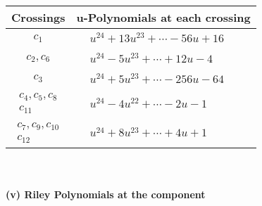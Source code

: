 \documentclass[1p]{elsarticle_modified}
\theoremstyle{definition}
\begin{document}
\begin{tabular}{m{50pt}|m{274pt}}
Crossings & \hspace{64pt}u-Polynomials at each crossing \\
\hline $$\begin{aligned}c_{1}\end{aligned}$$&$\begin{aligned}
&u^{24}+13 u^{23}+\cdots-56 u+16
\end{aligned}$\\
\hline $$\begin{aligned}c_{2},c_{6}\end{aligned}$$&$\begin{aligned}
&u^{24}-5 u^{23}+\cdots+12 u-4
\end{aligned}$\\
\hline $$\begin{aligned}c_{3}\end{aligned}$$&$\begin{aligned}
&u^{24}+5 u^{23}+\cdots-256 u-64
\end{aligned}$\\
\hline $$\begin{aligned}c_{4},c_{5},c_{8}\\c_{11}\end{aligned}$$&$\begin{aligned}
&u^{24}-4 u^{22}+\cdots-2 u-1
\end{aligned}$\\
\hline $$\begin{aligned}c_{7},c_{9},c_{10}\\c_{12}\end{aligned}$$&$\begin{aligned}
&u^{24}+8 u^{23}+\cdots+4 u+1
\end{aligned}$\\
\hline
\end{tabular}\\~\\
\newpage\renewcommand{\arraystretch}{1}
\flushleft \textbf{(v) Riley Polynomials at the component}\newline \\
\end{document}
